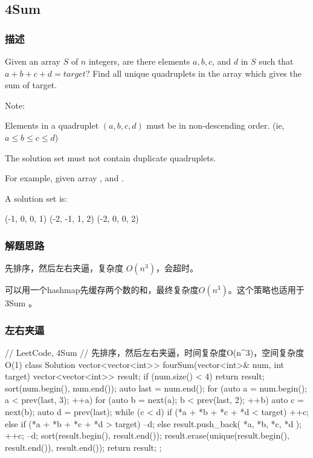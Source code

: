\subsection{4Sum} %
\label{sec:4sum}


\subsubsection{描述}
Given an array $S$ of $n$ integers, are there elements $a, b, c$, and $d$ in 
$S$ such that $a + b + c + d = target$? Find all unique quadruplets in the 
array which gives the sum of target.

Note:
\begindot
\item Elements in a quadruplet $(a,b,c,d)$ must be in non-descending order. 
(ie, $a \leq b \leq c \leq d$)
\item The solution set must not contain duplicate quadruplets.
\myenddot

For example, given array , and . 

A solution set is:
\begin{Code}
	(-1,  0, 0, 1)
	(-2, -1, 1, 2)
	(-2,  0, 0, 2)
\end{Code}


\subsubsection{解题思路}
先排序，然后左右夹逼，复杂度 $O(n^3)$，会超时。

可以用一个hashmap先缓存两个数的和，最终复杂度$O(n^3)$。这个策略也适用于 3Sum 。


\subsubsection{左右夹逼}
\begin{Code}
	// LeetCode, 4Sum
	// 先排序，然后左右夹逼，时间复杂度O(n^3)，空间复杂度O(1)
	class Solution {
		vector<vector<int>> fourSum(vector<int>& num, int target) {
			vector<vector<int>> result;
			if (num.size() < 4) return result;
			sort(num.begin(), num.end());
			auto last = num.end();
			for (auto a = num.begin(); a < prev(last, 3); ++a) {
				for (auto b = next(a); b < prev(last, 2); ++b) {
					auto c = next(b);
					auto d = prev(last);
					while (c < d) {
						if (*a + *b + *c + *d < target) {
							++c;
						} else if (*a + *b + *c + *d > target) {
							--d;
						} else {
							result.push_back({ *a, *b, *c, *d });
							++c;
							--d;
						}
					}
				}
			}
			sort(result.begin(), result.end());
			result.erase(unique(result.begin(), result.end()), result.end());
			return result;
		}
	};
\end{Code}


